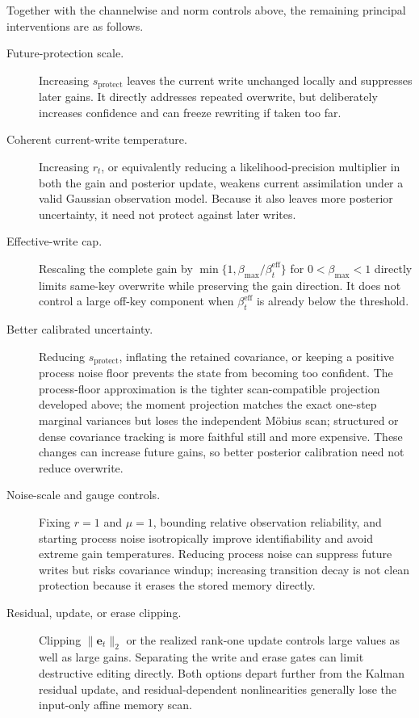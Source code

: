 \documentclass[11pt]{article}
\newcommand{\vct}[1]{\boldsymbol{#1}}
\begin{document}
Together with the channelwise and norm controls above, the remaining principal interventions are
as follows.
\begin{description}
  \item[Future-protection scale.]
  Increasing $s_{\mathrm{protect}}$ leaves the current write unchanged locally and suppresses later
  gains. It directly addresses repeated overwrite, but deliberately increases confidence and can
  freeze rewriting if taken too far.

  \item[Coherent current-write temperature.]
  Increasing $r_t$, or equivalently reducing a likelihood-precision multiplier in both the gain
  and posterior update, weakens current assimilation under a valid Gaussian observation model.
  Because it also leaves more posterior uncertainty, it need not protect against later writes.

  \item[Effective-write cap.]
  Rescaling the complete gain by
  $\min\{1,\beta_{\max}/\beta_t^{\mathrm{eff}}\}$ for
  $0<\beta_{\max}<1$ directly limits same-key overwrite while preserving the gain direction. It
  does not control a large off-key component when $\beta_t^{\mathrm{eff}}$ is already below the
  threshold.

  \item[Better calibrated uncertainty.]
  Reducing $s_{\mathrm{protect}}$, inflating the retained covariance, or keeping a positive process
  noise floor prevents the state from becoming too confident. The process-floor approximation is
  the tighter scan-compatible projection developed above; the moment projection matches the exact
  one-step marginal variances but loses the independent M\"obius scan; structured or dense
  covariance tracking is more faithful still and more expensive. These changes can increase future
  gains, so better posterior calibration need not reduce overwrite.

  \item[Noise-scale and gauge controls.]
  Fixing $r=1$ and $\mu=1$, bounding relative observation reliability, and starting process noise
  isotropically improve identifiability and avoid extreme gain temperatures. Reducing process
  noise can suppress future writes but risks covariance windup; increasing transition decay is not
  clean protection because it erases the stored memory directly.

  \item[Residual, update, or erase clipping.]
  Clipping $\|\vct{e}_t\|_2$ or the realized rank-one update controls large values as well as large
  gains. Separating the write and erase gates can limit destructive editing directly. Both options
  depart further from the Kalman residual update, and residual-dependent nonlinearities generally
  lose the input-only affine memory scan.
\end{description}
\end{document}
